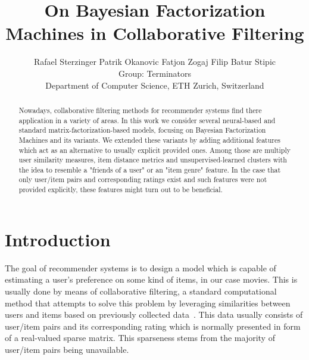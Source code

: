 \documentclass[10pt,conference,compsocconf]{IEEEtran}
\newcommand{\spacing}{\hspace{1cm}}
\begin{document}
    \setlength{\abovedisplayskip}{2pt}
    \setlength{\belowdisplayskip}{2pt}
    \setlength{\abovedisplayshortskip}{2pt}
    \setlength{\belowdisplayshortskip}{2pt}
    \title{On Bayesian Factorization Machines in Collaborative Filtering}

    \author{
    Rafael Sterzinger \spacing Patrik Okanovic \spacing Fatjon Zogaj \spacing Filip Batur Stipic\\
    Group: Terminators\\
    Department of Computer Science, ETH Zurich, Switzerland
    }

    \maketitle

    \begin{abstract}
        Nowadays, collaborative filtering methods for recommender systems find there application in a variety of areas.
        In this work we consider several neural-based and standard matrix-factorization-based models, focusing on Bayesian Factorization Machines and its variants.
        We extended these variants by adding additional features which act as an alternative to usually explicit provided ones.
        Among those are multiply user similarity measures, item distance metrics and unsupervised-learned clusters with the idea to resemble a "friends of a user" or an "item genre" feature.
        In the case that only user/item pairs and corresponding ratings exist and such features were not provided explicitly, these features might turn out to be beneficial.
    \end{abstract}


    \section{Introduction}

    The goal of recommender systems is to design a model which is capable of estimating a user's preference on some kind of items, in our case movies.
    This is usually done by means of collaborative filtering, a standard computational method that attempts to solve this problem by leveraging similarities between users and items based on previously collected data~\cite{CF_survey}.
    This data usually consists of user/item pairs and its corresponding rating which is normally presented in form of a real-valued sparse matrix.
    This sparseness stems from the majority of user/item pairs being unavailable.
\end{document}
